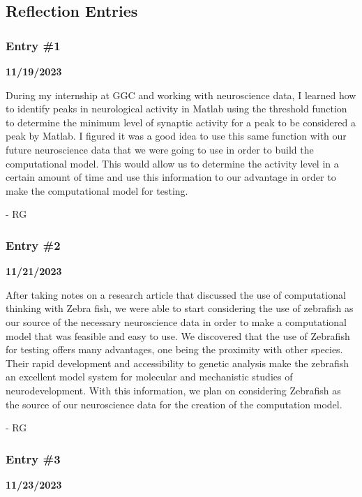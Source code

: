 \subsection{Reflection Entries}\label{reflection-entries}

\subsubsection{Entry \#1}\label{entry-1}

\textbf{11/19/2023}

During my internship at GGC and working with neuroscience data, I
learned how to identify peaks in neurological activity in Matlab using
the threshold function to determine the minimum level of synaptic
activity for a peak to be considered a peak by Matlab. I figured it was
a good idea to use this same function with our future neuroscience data
that we were going to use in order to build the computational model.
This would allow us to determine the activity level in a certain amount
of time and use this information to our advantage in order to make the
computational model for testing.

- RG

\subsubsection{Entry \#2}\label{entry-2}

\textbf{11/21/2023}

After taking notes on a research article that discussed the use of
computational thinking with Zebra fish, we were able to start
considering the use of zebrafish as our source of the necessary
neuroscience data in order to make a computational model that was
feasible and easy to use. We discovered that the use of Zebrafish for
testing offers many advantages, one being the proximity with other
species. Their rapid development and accessibility to genetic analysis
make the zebrafish an excellent model system for molecular and
mechanistic studies of neurodevelopment. With this information, we plan
on considering Zebrafish as the source of our neuroscience data for the
creation of the computation model.

- RG

\subsubsection{Entry \#3}\label{entry-3}

\textbf{11/23/2023}

